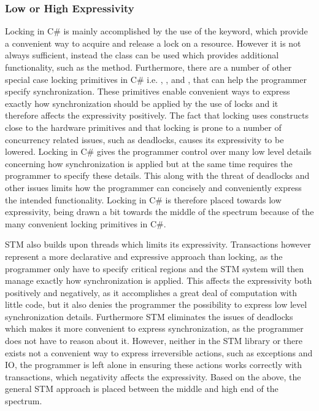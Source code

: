 \subsubsection{Low or High Expressivity}\label{subsec:expressivity}
Locking in C\# is mainly accomplished by the use of the  keyword, which provide a convenient way to acquire and release a lock on a resource. However it is not always sufficient, instead the  class can be used which provides additional functionality, such as the  method. Furthermore, there are a number of other special case locking primitives in C\#\cite{microsoftSyncPrim} i.e. , ,  and , that can help the programmer specify synchronization. These primitives enable convenient ways to express exactly how synchronization should be applied by the use of locks and it therefore affects the expressivity positively. The fact that locking uses constructs close to the hardware primitives and that  locking is prone to a number of concurrency related issues, such as deadlocks, causes its expressivity to be lowered. Locking in C\# gives the programmer control over many low level details concerning how synchronization is applied but at the same time requires the programmer to specify these details. This along with the threat of deadlocks and other issues limits how the programmer can concisely and conveniently express the intended functionality. Locking in C\# is therefore placed towards low expressivity, being drawn a bit towards the middle of the spectrum because of the many convenient locking primitives in C\#.

\ac{STM} also builds upon threads which limits its expressivity. Transactions however represent a more declarative and expressive approach than locking, as the programmer only have to specify critical regions and the \ac{STM} system will then manage exactly how synchronization is applied. This affects the expressivity both positively and negatively, as it accomplishes a great deal of computation with little code, but it also denies the programmer the possibility to express low level synchronization details. Furthermore \ac{STM} eliminates the issues of deadlocks which makes it more convenient to express synchronization, as the programmer does not have to reason about it. However, neither in the \ac{STM} library or \stmname there exists not a convenient way to express irreversible actions, such as exceptions and \ac{IO}, the programmer is left alone in ensuring these actions works correctly with transactions, which negativity affects the expressivity. Based on the above, the general \ac{STM} approach is placed between the middle and high end of the spectrum.

